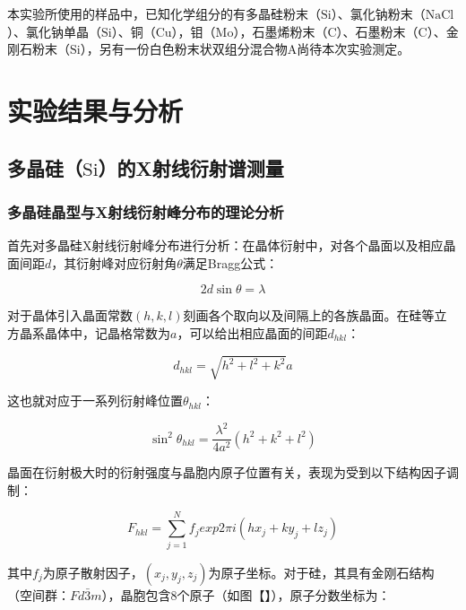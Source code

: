 \documentclass{thuemp}
\begin{document}
本实验所使用的样品中，已知化学组分的有多晶硅粉末（$\text{Si}$）、氯化钠粉末（$\text{NaCl}$）、氯化钠单晶（$\text{Si}$）、铜（$\text{Cu}$），钼（$\text{Mo}$），石墨烯粉末（$\text{C}$）、石墨粉末（$\text{C}$）、金刚石粉末（$\text{Si}$），另有一份白色粉末状双组分混合物A尚待本次实验测定。

\section{实验结果与分析}

\subsection{多晶硅（$\text{Si}$）的X射线衍射谱测量}

\subsubsection{多晶硅晶型与X射线衍射峰分布的理论分析}

首先对多晶硅X射线衍射峰分布进行分析：在晶体衍射中，对各个晶面以及相应晶面间距$d$，其衍射峰对应衍射角$\theta$满足Bragg公式：

\begin{equation}
    2d\sin\theta  = \lambda
    \label{eq:bragg}
\end{equation}

对于晶体引入晶面常数$(h,k,l)$刻画各个取向以及间隔上的各族晶面。在硅等立方晶系晶体中，记晶格常数为$a$，可以给出相应晶面的间距$d_{hkl}$：

\begin{equation}
    d_{hkl} = \sqrt{h^2+l^2+k^2} a
    \label{eq:d_hkl}
\end{equation}

这也就对应于一系列衍射峰位置$\theta_{hkl}$：

\begin{equation}
    \sin^2 \theta_{hkl} = \frac{\lambda^2}{4a^2}(h^2+k^2+l^2)
    \label{eq:theta_hkl}
\end{equation}

晶面在衍射极大时的衍射强度与晶胞内原子位置有关，表现为受到以下结构因子调制：

\begin{equation}
    F_{hkl} = \sum_{j = 1}^{N} f_j exp{2\pi i (hx_j + ky_j + lz_j)}
    \label{eq:structure_factor}
\end{equation}

其中$f_j$为原子散射因子，$(x_j,y_j,z_j)$为原子坐标。对于硅，其具有金刚石结构（空间群：$Fd\bar{3}m$），晶胞包含8个原子（如图【】），原子分数坐标为：
\end{document}
